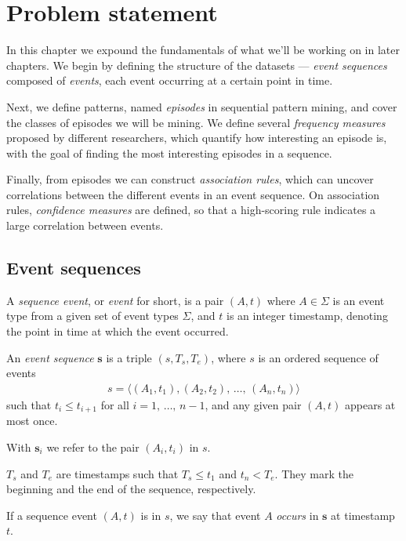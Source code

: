 \chapter{Problem statement}
\label{sec:problem-statement}

In this chapter we expound the fundamentals of what we'll be working on in later chapters. We begin by defining the structure of the datasets --- \emph{event sequences} composed of \emph{events}, each event occurring at a certain point in time.

Next, we define patterns, named \emph{episodes} in sequential pattern mining, and cover the classes of episodes we will be mining. We define several \emph{frequency measures} proposed by different researchers, which quantify how interesting an episode is, with the goal of finding the most interesting episodes in a sequence.

Finally, from episodes we can construct \emph{association rules}, which can uncover correlations between the different events in an event sequence. On association rules, \emph{confidence measures} are defined, so that a high-scoring rule indicates a large correlation between events.

\section{Event sequences}

\begin{definition}
A \emph{sequence event}, or \emph{event} for short, is a pair $ (A, t) $ where $ A \in \Sigma $ is an event type from a given set of event types $ \Sigma $, and $ t $ is an integer timestamp, denoting the point in time at which the event occurred.
\end{definition}

\begin{definition}
An \emph{event sequence} $ \boldsymbol{s} $ is a triple $ (s, T_s, T_e) $, where $ s $ is an ordered sequence of events
\begin{align*}
s = \langle (A_1, t_1), (A_2, t_2), \, \ldots, \, (A_n, t_n) \rangle
\end{align*}
such that $ t_i \leq t_{i + 1} $ for all $ i = 1, \, \ldots, \, n - 1 $, and any given pair $ (A, t) $ appears at most once.

With $ \boldsymbol{s}_i $ we refer to the pair $ (A_i, t_i) $ in $ s $.

$ T_s $ and $ T_e $ are timestamps such that $ T_s \leq t_1 $ and $ t_n < T_e $. They mark the beginning and the end of the sequence, respectively.

If a sequence event $ (A, t) $ is in $ s $, we say that event $ A $ \emph{occurs} in $ \boldsymbol{s} $ at timestamp $ t $.
\end{definition}

